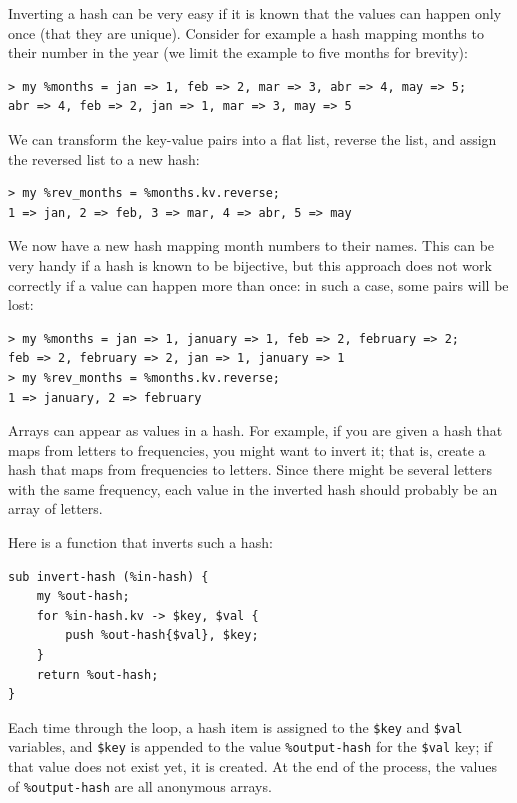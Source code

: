 Inverting a hash can be very easy if it is known that the 
values can happen only once (that they are unique). Consider 
for example a hash mapping months to their number in the year 
(we limit the example to five months for brevity):

\begin{verbatim}
> my %months = jan => 1, feb => 2, mar => 3, abr => 4, may => 5;
abr => 4, feb => 2, jan => 1, mar => 3, may => 5
\end{verbatim}
%

We can transform the key-value pairs into a flat list, 
reverse the list, and assign the reversed list to a new 
hash:

\begin{verbatim}
> my %rev_months = %months.kv.reverse;
1 => jan, 2 => feb, 3 => mar, 4 => abr, 5 => may
\end{verbatim}
%

We now have a new hash mapping month numbers to their names.
This can be very handy if a hash is known to be bijective, but this approach does not work correctly if a value can 
happen more than once: in such a case, some pairs will be 
lost:

\begin{verbatim}
> my %months = jan => 1, january => 1, feb => 2, february => 2;
feb => 2, february => 2, jan => 1, january => 1
> my %rev_months = %months.kv.reverse;
1 => january, 2 => february
\end{verbatim}

Arrays can appear as values in a hash.  For example, if you
are given a hash that maps from letters to frequencies, you
might want to invert it; that is, create a hash that maps
from frequencies to letters.  Since there might be several 
letters with the same frequency, each value in the inverted hash 
should probably be an array of letters.

Here is a function that inverts such a hash:

\begin{verbatim}
sub invert-hash (%in-hash) { 
    my %out-hash; 
    for %in-hash.kv -> $key, $val {
        push %out-hash{$val}, $key; 
    }
    return %out-hash;
}
\end{verbatim}
%
Each time through the loop, a hash item is assigned to the  \verb'$key' and \verb'$val' variables, and \verb'$key' is 
appended to the value \verb'%output-hash' for the \verb'$val' 
key; if that value does not exist yet, it is created. At 
the end of the process, the values of \verb'%output-hash' are 
all anonymous arrays.

